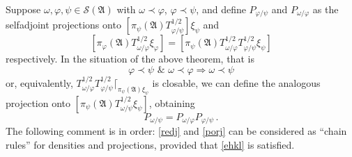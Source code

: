\documentclass[12pt]{amsart}
\numberwithin{equation}{section}
\def\cs{{\mathcal S}}
\def\ga{{\mathfrak A}} \def\gpa{{\mathfrak a}}
\def\f{\varphi}\def\ff{\phi} \def\F{\Phi}
\def\om{\omega} \def\Om{\Omega}
\begin{document}
Suppose $\om,\f,\psi\in\cs(\ga)$ with $\om\prec\f$, $\f\prec\psi$, and define $P_{\f/\psi}$ and $P_{\om/\f}$ as the selfadjoint projections onto 
$[\pi_\psi(\ga)T^{1/2}_{\f/\psi}]\xi_\psi$ and 
$$
[\pi_\f(\ga)T^{1/2}_{\om/\f}\xi_\f]=[\pi_\psi(\ga)T^{1/2}_{\om/\f}T^{1/2}_{\f/\psi}\xi_\psi]
$$ 
respectively. In the situation of the above theorem, that is 
\begin{equation}
\label{ehkl}
\f\prec\psi\,\,\&\,\,\om\prec\f\Rightarrow \om\prec\psi 
\end{equation}
or, equivalently,
$T^{1/2}_{\om/\f}T^{1/2}_{\f/\psi}\lceil_{\pi_\psi(\ga)\xi_\psi}$ is closable,
we can define the analogous projection onto $[\pi_\psi(\ga)T^{1/2}_{\om/\psi}\xi_\psi]$, obtaining
\begin{equation}
\label{porj}
P_{\om/\psi}=P_{\om/\f}P_{\f/\psi}\,.
\end{equation}
The following comment is in order: \eqref{redj} and \eqref{porj} can be considered as ``chain rules'' for densities and projections, provided that \eqref{ehkl} is satisfied.
\end{document}
